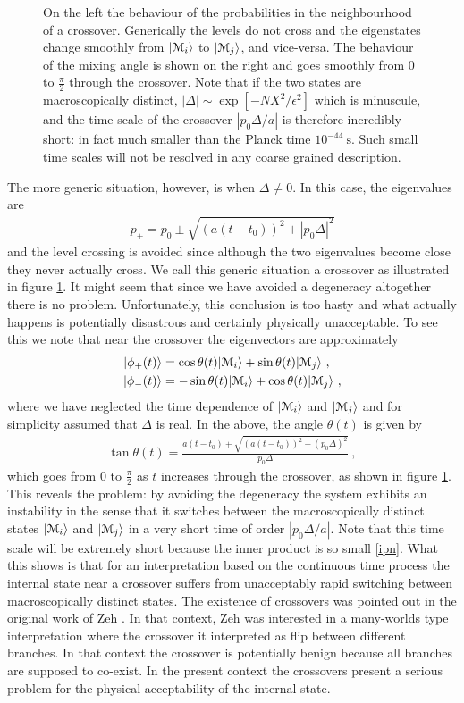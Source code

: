 \documentclass[12pt]{article}
\def\BM{{\EuScript M}}
\def\ket#1{| #1\rangle}
\newcommand{\EQ}[1]{\begin{equation}\begin{split} #1
\end{split}\end{equation}}
\begin{document}
\begin{figure}[ht]
\begin{minipage}[t]{.47\textwidth}
\begin{center}
   \end{center}
  \end{minipage}
  \caption{\small On the left the behaviour of the probabilities in the neighbourhood of a crossover. Generically the levels do not cross and the eigenstates change smoothly from $\ket{\BM_i}$ to $\ket{\BM_j}$, and vice-versa. The behaviour of the mixing angle is shown on the right and goes smoothly from 0 to $\frac\pi2$ through the crossover. Note that if the two states are macroscopically distinct, $|\Delta|\sim \exp[-NX^2/\epsilon^2]$ which is minuscule, and the time scale of the crossover $|p_0\Delta/a|$ is therefore incredibly short: in fact much smaller than the Planck time $10^{-44}\ \text{s}$. Such small time scales will not be resolved in any coarse grained description.}
\label{f4}
\end{figure}

The more generic situation, however, is when $\Delta\neq0$. In this case, the eigenvalues are
\EQ{
p_\pm=p_0\pm\sqrt{(a(t-t_0))^2+|p_0\Delta|^2}
}
and the level crossing is avoided since although the two eigenvalues become close they 
never actually cross. We call this generic situation a crossover as illustrated in figure \ref{f4}. 
It might seem that since we have avoided a degeneracy altogether there is no problem. Unfortunately, this conclusion is too hasty and what actually happens is potentially disastrous and certainly physically unacceptable. To see this we note that near the crossover the eigenvectors are approximately
\EQ{
\ket{\phi_+(t)}&=\cos\theta(t)\ket{\BM_i}+\sin\theta(t)\ket{\BM_j}\ ,\\ \ket{\phi_-(t)}&=-\sin\theta(t)\ket{\BM_i}+\cos\theta(t)\ket{\BM_j}\ ,
}
where we have neglected the time dependence of $\ket{\BM_i}$ and $\ket{\BM_j}$ and for simplicity assumed that $\Delta$ is real. In the above, the angle $\theta(t)$ is given by
\EQ{
\tan\theta(t)=\frac{a(t-t_0)+\sqrt{(a(t-t_0))^2+(p_0\Delta)^2}}{p_0\Delta}\ ,
}
which goes from $0$ to $\frac\pi2$ as $t$ increases through the crossover, as shown in figure \ref{f4}. This reveals the problem: by avoiding the degeneracy the system exhibits an instability in the sense that it switches between the macroscopically distinct states $\ket{\BM_i}$ and $\ket{\BM_j}$ in a very short time of order $|p_0\Delta/a|$. Note that this time scale will be extremely short because the inner product is so small \eqref{ipn}. What this shows is that for an interpretation based on the continuous time process the internal state near a crossover suffers from unacceptably rapid switching between macroscopically distinct states. The existence of crossovers was pointed out in the original work of Zeh \cite{Zeh70,Zeh73, Zeh00,Zeh05}. In that context, Zeh was interested in a many-worlds type interpretation where the crossover it interpreted as 
flip between different branches. In that context the crossover is potentially benign because all branches are supposed to co-exist. In the present context the crossovers present a serious problem for the physical acceptability of the internal state.
\end{document}
